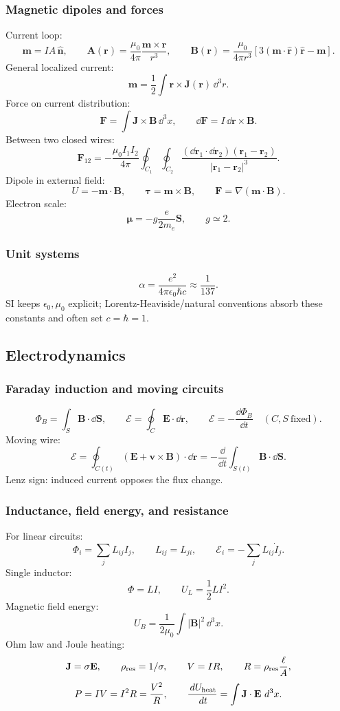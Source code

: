 \subsubsection*{Magnetic dipoles and forces}
Current loop:
\[
\mathbf m=IA\,\hat{\mathbf n},\qquad
\mathbf A(\mathbf r)=\frac{\mu_0}{4\pi}\frac{\mathbf m\times\mathbf r}{r^3},\qquad
\mathbf B(\mathbf r)=\frac{\mu_0}{4\pi r^3}\left[3(\mathbf m\cdot\hat{\mathbf r})\hat{\mathbf r}-\mathbf m\right].
\]
General localized current:
\[
\mathbf m=\frac12\int\mathbf r\times\mathbf J(\mathbf r)\,\dd^3r.
\]
Force on current distribution:
\[
\mathbf F=\int\mathbf J\times\mathbf B\,\dd^3x,\qquad
\dd\mathbf F=I\,\dd\mathbf r\times\mathbf B.
\]
Between two closed wires:
\[
\mathbf F_{12}=-\frac{\mu_0I_1I_2}{4\pi}\oint_{C_1}\oint_{C_2}
\frac{(\dd\mathbf r_1\cdot\dd\mathbf r_2)(\mathbf r_1-\mathbf r_2)}
{|\mathbf r_1-\mathbf r_2|^3}.
\]
Dipole in external field:
\[
U=-\mathbf m\cdot\mathbf B,\qquad
\boldsymbol\tau=\mathbf m\times\mathbf B,\qquad
\mathbf F=\nabla(\mathbf m\cdot\mathbf B).
\]
Electron scale:
\[
\boldsymbol\mu=-g\frac{e}{2m_e}\mathbf S,\qquad g\simeq2.
\]

\subsubsection*{Unit systems}
\[
\alpha=\frac{e^2}{4\pi\epsilon_0\hbar c}\approx\frac{1}{137}.
\]
SI keeps $\epsilon_0,\mu_0$ explicit; Lorentz-Heaviside/natural conventions absorb
these constants and often set $c=\hbar=1$. 

\subsection{Electrodynamics}

\subsubsection*{Faraday induction and moving circuits}
\[
\Phi_B=\int_S\mathbf B\cdot\dd\mathbf S,\qquad
\mathcal E=\oint_C\mathbf E\cdot\dd\mathbf r,\qquad
\boxed{\mathcal E=-\frac{\dd\Phi_B}{\dd t}}\quad(C,S\ \text{fixed}).
\]
Moving wire:
\[
\boxed{\mathcal E=\oint_{C(t)}(\mathbf E+\mathbf v\times\mathbf B)\cdot\dd\mathbf r
=-\frac{\dd}{\dd t}\int_{S(t)}\mathbf B\cdot\dd\mathbf S}.
\]
Lenz sign: induced current opposes the flux change. 

\subsubsection*{Inductance, field energy, and resistance}
For linear circuits:
\[
\Phi_i=\sum_jL_{ij}I_j,\qquad L_{ij}=L_{ji},\qquad
\mathcal E_i=-\sum_jL_{ij}\dot I_j.
\]
Single inductor:
\[
\Phi=LI,\qquad U_L=\frac12LI^2.
\]
Magnetic field energy:
\[
\boxed{U_B=\frac{1}{2\mu_0}\int|\mathbf B|^2\,\dd^3x}.
\]
Ohm law and Joule heating:
\[
\mathbf J=\sigma\mathbf E,\qquad \rho_{\rm res}=1/\sigma,\qquad
V=IR,\qquad R=\rho_{\rm res}\frac{\ell}{A},
\]
\[
P=IV=I^2R=\frac{V^2}{R},\qquad
\frac{\,d U_{\rm heat}}{\,d t}=\int\mathbf J\cdot\mathbf E\,\,d^3x.
\]

